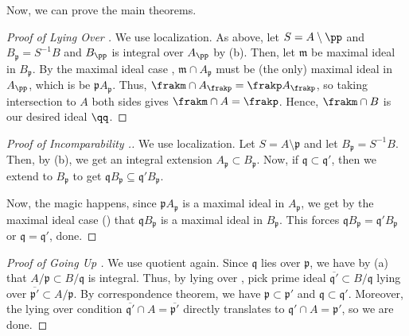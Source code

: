 Now, we can prove the main theorems.
\begin{proof}[Proof of Lying Over ]
We use localization. As above, let 
$S=A\setminus \pp$ and $B_{\mathfrak p} = S^{-1}B$
and $B_\pp$ is integral over $A_\pp$ by 
 (b).
Then, let $\mathfrak m$ be maximal ideal in $B_{\mathfrak p}$.
By the maximal ideal case , $\mathfrak m \cap A_{\mathfrak p}$ must be (the only) maximal ideal in $A_\pp$, which is be $\mathfrak p A_{\mathfrak p}$.
Thus, $\frakm \cap A_\frakp = \frakp A_\frakp$,
so taking intersection to $A$ both sides gives
$\frakm\cap A = \frakp$.
Hence, $\frakm\cap B$ is our desired ideal $\qq$.
\end{proof}

\begin{proof}[Proof of Incomparability 
.]
    We use localization.
    Let $S=A\setminus\mathfrak p$ and let
    $B_{\mathfrak p} = S^{-1}B$.
    Then, by  (b),
    we get an integral extension 
    $A_{\mathfrak p}\subset B_{\mathfrak p}$.
    Now, if $\mathfrak q\subset\mathfrak q'$,
    then we extend to $B_{\mathfrak p}$
    to get $\mathfrak qB_{\mathfrak p}\subseteq
    \mathfrak q'B_{\mathfrak p}$.
    
    Now, the magic happens, since $\mathfrak pA_{\mathfrak p}$
    is a maximal ideal in $A_{\mathfrak p}$,
    we get by the maximal ideal case ()
    that $\mathfrak qB_{\mathfrak p}$ 
    is a maximal ideal in $B_{\mathfrak p}$.
    This forces $\mathfrak qB_{\mathfrak p}
    = \mathfrak q'B_{\mathfrak p}$
    or $\mathfrak q = \mathfrak q'$, done.
\end{proof}

\begin{proof}[Proof of Going Up ]
We use quotient again.
Since $\mathfrak q$ lies over $\mathfrak p$,
we have by  (a) that $A/\mathfrak p \subset B/\mathfrak q$
is integral.
Thus, by lying over , pick 
prime ideal $\overline{\mathfrak q'}\subset B/\mathfrak q$
lying over $\overline{\mathfrak p'}\subset A/\mathfrak p$.
By correspondence theorem,
we have $\mathfrak p\subset\mathfrak p'$
and $\mathfrak q\subset\mathfrak q'$.
Moreover, the lying over condition
$\overline{\mathfrak q'}\cap A = \overline{\mathfrak p'}$
directly translates to
$\mathfrak q'\cap A = \mathfrak p'$,
so we are done.
\end{proof}


